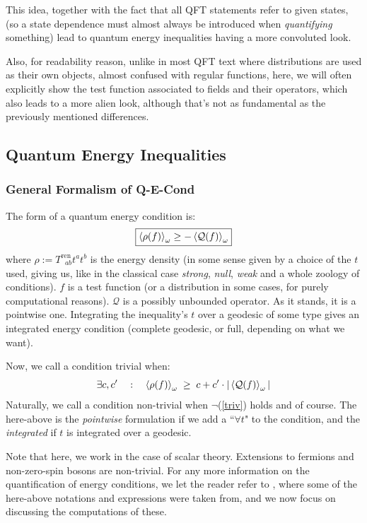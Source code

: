 \documentclass[a4paper,11pt]{article}
\numberwithin{equation}{section}
\theoremstyle{definition}
\begin{document}
This idea, together with the fact that all QFT statements refer to given states, (so a state dependence must almost always be introduced when \emph{quantifying} something) lead to quantum energy inequalities having a more convoluted look.

Also, for readability reason, unlike in most QFT text where distributions are used as their own objects, almost confused with regular functions, here, we will often explicitly show the test function associated to fields and their operators, which also leads to a more alien look, although that's not as fundamental as the previously mentioned differences.
\subsection{Quantum Energy Inequalities}
\subsubsection{General Formalism of Q-E-Cond}
The form of a quantum energy condition is:
\begin{equation}
\boxed{\braket{\rho(f)}_\omega \geq - \braket{\mathcal{Q}(f)}_\omega}
\end{equation}
where $\rho:=T^\mathrm{ren}_{\;\;ab}t^at^b$ is the energy density (in some sense given by a choice of the $t$ used, giving us, like in the classical case \emph{strong}, \emph{null}, \emph{weak} and a whole zoology of conditions). $f$ is a test function (or a distribution in some cases, for purely computational reasons). $\mathcal{Q}$ is a possibly unbounded operator. As it stands, it is a pointwise one. Integrating the inequality's $t$ over a geodesic of some type gives an integrated energy condition (complete geodesic, or full, depending on what we want).

\noindent Now, we call a condition trivial when:
\begin{equation} \label{triv}
    \exists c, c' \quad : \quad \braket{\rho(f)}_\omega \; \geq \; c + c'\cdot|\braket{\mathcal{Q}(f)}_\omega|
\end{equation}
Naturally, we call a condition non-trivial when $\lnot$(\ref{triv}) holds and of course. The here-above is the \textit{pointwise} formulation if we add a ``$\forall t$" to the condition, and the \textit{integrated} if $t$ is integrated over a geodesic.

Note that here, we work in the case of scalar theory. Extensions to fermions and non-zero-spin bosons are non-trivial. For any more information on the quantification of energy conditions, we let the reader refer to \cite{EleRev}, where some of the here-above notations and expressions were taken from, and we now focus on discussing the computations of these.
\end{document}
